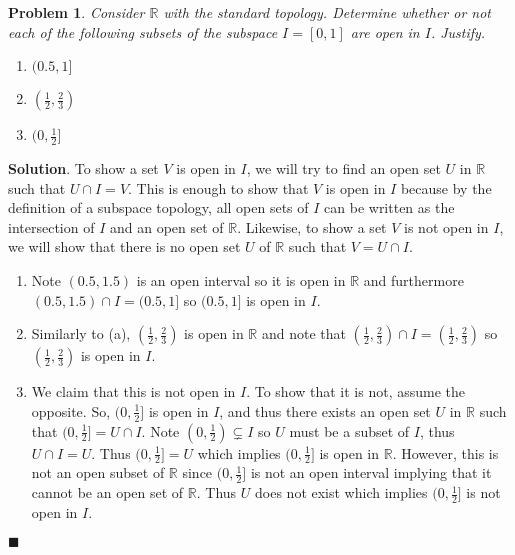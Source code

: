 \documentclass[12pt]{article}
\renewcommand{\=}[1]{\stackrel{#1}{=}} %
\providecommand{\RR}{\mathbb{R}}
\newtheorem{p}{Problem}[section]
\theoremstyle{definition}
\newenvironment{s}{%
        \begin{trivlist} \item \textbf{Solution}. }{%
            \hspace*{\fill} $\blacksquare$\end{trivlist}}%
\begin{document}
\begin{p}
    Consider $\RR$ with the standard topology. Determine whether or not each of the following subsets of the subspace $I = [0,1]$ are open
    in $I$. Justify.
    \begin{enumerate}
        \item[(a)] $(0.5,1]$
        \item[(b)] $(\frac{1}{2}, \frac{2}{3})$
        \item[(c)] $(0,\frac{1}{2}]$
    \end{enumerate}
\end{p}
\begin{s}
    To show a set $V$ is open in $I$, we will try to find an open set $U$ in $\RR$ such that $U\cap I = V$. This is enough to show that $V$ is 
    open in $I$
    because by the definition of a subspace topology, all open sets of $I$ can be written as the intersection of $I$ and an open set of
    $\RR$. Likewise, to show a set $V$ is not open in $I$, we will show that there is no open set $U$ of $\RR$ such that $V = U \cap I$.
    \begin{enumerate}
        \item[(a)] Note $(0.5,1.5)$ is an open interval so it is open in $\RR$ and furthermore $(0.5,1.5)\cap I = (0.5,1]$ so $(0.5,1]$ is
            open in $I$.
        \item[(b)] Similarly to (a), $(\frac{1}{2},\frac{2}{3})$ is open in $\RR$ and note that $(\frac{1}{2},\frac{2}{3})\cap I = 
            (\frac{1}{2},\frac{2}{3})$ so $(\frac{1}{2},\frac{2}{3})$ is open in $I$.
        \item[(c)] We claim that this is not open in $I$. To show that it is not, assume the opposite. So, $(0,\frac{1}{2}]$ is open
            in $I$, and thus there exists an open set $U$ in $\RR$ such that $(0,\frac{1}{2}] = U \cap I$. Note $(0,\frac{1}{2})\subsetneq I$
            so $U$ must be a subset of $I$, thus $U \cap I = U$. Thus $(0,\frac{1}{2}] = U$ which implies $(0,\frac{1}{2}]$ is open in $\RR$.
            However, this is not an open subset of $\RR$ since $(0,\frac{1}{2}]$ is not an open interval implying that it cannot be an open
            set of $\RR$. Thus $U$ does not exist which implies $(0,\frac{1}{2}]$ is not open in $I$.
    \end{enumerate}
\end{s}
\end{document}
